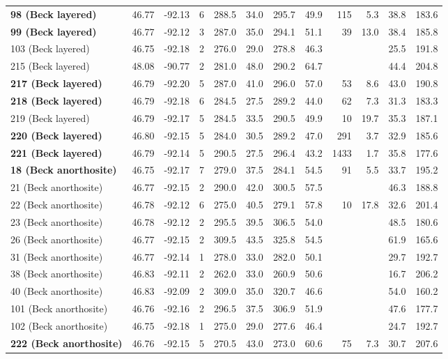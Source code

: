 \documentclass[11pt,letterpaper]{article}
\begin{document}
\begin{table}[h!]
\begin{tabular}{|l|r|r|r|r|r|r|r|r|r|r|r|}
\textbf{98 (Beck layered)	}	&	46.77	&	-92.13	&	6	&	288.5	&	34.0	&	295.7	&	49.9	&	115	&	5.3	&	38.8	&	183.6	\\
\textbf{99 (Beck layered)	}	&	46.77	&	-92.12	&	3	&	287.0	&	35.0	&	294.1	&	51.1	&	39	&	13.0	&	38.4	&	185.8	\\
	103 (Beck layered)		&	46.75	&	-92.18	&	2	&	276.0	&	29.0	&	278.8	&	46.3	&		&		&	25.5	&	191.8	\\
	215 (Beck layered)		&	48.08	&	-90.77	&	2	&	281.0	&	48.0	&	290.2	&	64.7	&		&		&	44.4	&	204.8	\\
\textbf{217 (Beck layered)	}	&	46.79	&	-92.20	&	5	&	287.0	&	41.0	&	296.0	&	57.0	&	53	&	8.6	&	43.0	&	190.8	\\
\textbf{218 (Beck layered)	}	&	46.79	&	-92.18	&	6	&	284.5	&	27.5	&	289.2	&	44.0	&	62	&	7.3	&	31.3	&	183.3	\\
	219 (Beck layered)		&	46.79	&	-92.17	&	5	&	284.5	&	33.5	&	290.5	&	49.9	&	10	&	19.7	&	35.3	&	187.1	\\
\textbf{220 (Beck layered)	}	&	46.80	&	-92.15	&	5	&	284.0	&	30.5	&	289.2	&	47.0	&	291	&	3.7	&	32.9	&	185.6	\\
\textbf{221 (Beck layered)	}	&	46.79	&	-92.14	&	5	&	290.5	&	27.5	&	296.4	&	43.2	&	1433	&	1.7	&	35.8	&	177.6	\\
\textbf{18 (Beck anorthosite)	}	&	46.75	&	-92.17	&	7	&	279.0	&	37.5	&	284.1	&	54.5	&	91	&	5.5	&	33.7	&	195.2	\\
	21 (Beck anorthosite)		&	46.77	&	-92.15	&	2	&	290.0	&	42.0	&	300.5	&	57.5	&		&		&	46.3	&	188.8	\\
	22 (Beck anorthosite)		&	46.78	&	-92.12	&	6	&	275.0	&	40.5	&	279.1	&	57.8	&	10	&	17.8	&	32.6	&	201.4	\\
	23 (Beck anorthosite)		&	46.78	&	-92.12	&	2	&	295.5	&	39.5	&	306.5	&	54.0	&		&		&	48.5	&	180.6	\\
	26 (Beck anorthosite)		&	46.77	&	-92.15	&	2	&	309.5	&	43.5	&	325.8	&	54.5	&		&		&	61.9	&	165.6	\\
	31 (Beck anorthosite)		&	46.77	&	-92.14	&	1	&	278.0	&	33.0	&	282.0	&	50.1	&		&		&	29.7	&	192.7	\\
	38 (Beck anorthosite)		&	46.83	&	-92.11	&	2	&	262.0	&	33.0	&	260.9	&	50.6	&		&		&	16.7	&	206.2	\\
	40 (Beck anorthosite)		&	46.83	&	-92.09	&	2	&	309.0	&	35.0	&	320.7	&	46.6	&		&		&	54.0	&	160.2	\\
	101 (Beck anorthosite)		&	46.76	&	-92.16	&	2	&	296.5	&	37.5	&	306.9	&	51.9	&		&		&	47.6	&	177.7	\\
	102 (Beck anorthosite)		&	46.75	&	-92.18	&	1	&	275.0	&	29.0	&	277.6	&	46.4	&		&		&	24.7	&	192.7	\\
\textbf{222 (Beck anorthosite)	}	&	46.76	&	-92.15	&	5	&	270.5	&	43.0	&	273.0	&	60.6	&	75	&	7.3	&	30.7	&	207.6	\\
\hline
\end{tabular}


\end{table}
\end{document}
